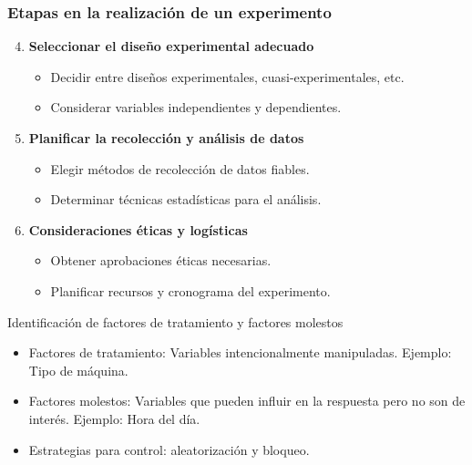 ﻿\documentclass{beamer}
\begin{document}
\begin{frame}
\frametitle{Etapas en la realización de un experimento}
\begin{enumerate}
    \setcounter{enumi}{3}
    \item \textbf{Seleccionar el diseño experimental adecuado}
    \begin{itemize}
        \item Decidir entre diseños experimentales, cuasi-experimentales, etc.
        \item Considerar variables independientes y dependientes.
    \end{itemize}
    \vspace{0.3cm}
    \item \textbf{Planificar la recolección y análisis de datos}
    \begin{itemize}
        \item Elegir métodos de recolección de datos fiables.
        \item Determinar técnicas estadísticas para el análisis.
    \end{itemize}
    \vspace{0.3cm}
    \item \textbf{Consideraciones éticas y logísticas}
    \begin{itemize}
        \item Obtener aprobaciones éticas necesarias.
        \item Planificar recursos y cronograma del experimento.
    \end{itemize}
\end{enumerate}
\end{frame}

\begin{frame}{Identificación de factores de tratamiento y factores molestos}
\begin{itemize}
    \item Factores de tratamiento: Variables intencionalmente manipuladas. Ejemplo: Tipo de máquina.
    \item Factores molestos: Variables que pueden influir en la respuesta pero no son de interés. Ejemplo: Hora del día.
    \item Estrategias para control: aleatorización y bloqueo.
\end{itemize}
\end{frame}
\end{document}
